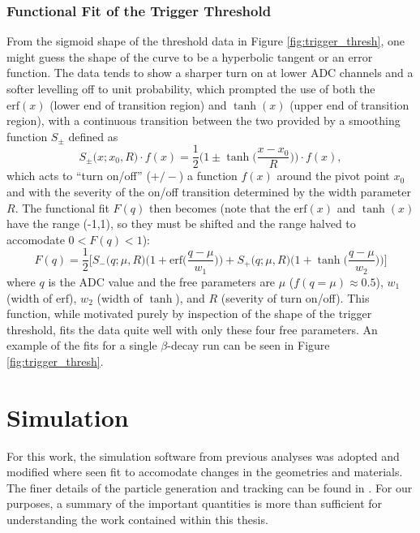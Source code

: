 \subsubsection{Functional Fit of the Trigger Threshold}
From the sigmoid shape of the threshold data in Figure \ref{fig:trigger_thresh}, one might guess
the shape of the curve to be a hyperbolic tangent or an error function. The data tends to show
a sharper turn on at lower ADC channels and a softer levelling off to unit probability, which
prompted the use of both the $\mathrm{erf}(x)$ (lower end of transition region)
and $\tanh(x)$ (upper end of transition region),
with a continuous transition between the
two provided by a smoothing function $S_\pm$ defined as
%
\begin{equation}
  S_\pm\big(x;x_0,R\big) \cdot f(x) = \frac{1}{2}\bigg(1\pm\tanh\Big(\frac{x-x_0}{R}\Big)\bigg) \cdot f(x),
\end{equation}
%
which acts to ``turn on/off'' ($+/-$) a function $f(x)$ around the pivot point $x_0$ and with the severity of
the on/off transition determined by the width parameter $R$. The functional fit $F(q)$ then becomes (note that the $\mathrm{erf}(x)$ and $\tanh(x)$ 
have the range (-1,1), so they must be shifted and the range halved to accomodate $0<F(q)<1$):
%
\begin{equation}
  F(q) = \frac{1}{2} \Bigg[ S_-\big(q;\mu,R\big) \bigg(1 + \mathrm{erf}\Big(\frac{q-\mu}{w_1}\Big)\bigg) +
  S_+\big(q;\mu,R\big) \bigg(1+\tanh\Big(\frac{q-\mu}{w_2}\Big)\bigg)\Bigg]
\end{equation}
%
where $q$ is the ADC value and
the free parameters are $\mu$ ($f(q=\mu)\approx 0.5$), $w_1$ (width of $\mathrm{erf}$), $w_2$ (width of $\tanh$), and $R$ (severity of turn on/off).
This function, while motivated purely by inspection of the shape of the trigger threshold, fits the data
quite well with only these four free parameters. An example of the fits for a single $\beta$-decay
run can be seen in Figure \ref{fig:trigger_thresh}. 



\section{Simulation}
\label{sec:Simulation}

For this work, the simulation software from previous analyses was adopted
and modified where seen fit to accomodate changes in the geometries
and materials. The finer details of the particle generation and
tracking can be found in \cite{mpmThesis}. For our purposes, a summary
of the important quantities is more than sufficient for understanding
the work contained within this thesis.

